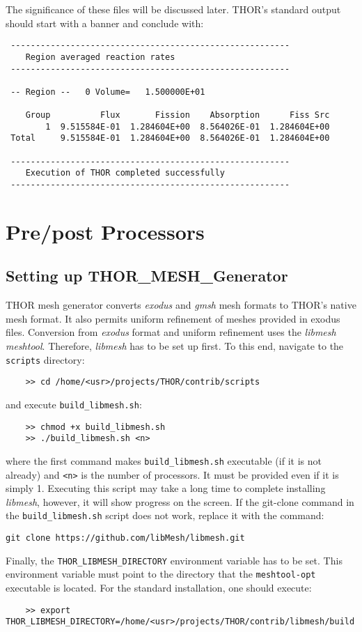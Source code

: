 The significance of these files will be discussed later.
THOR's standard output should start with a banner and conclude with:
\begin{verbatim}
 --------------------------------------------------------
    Region averaged reaction rates
 --------------------------------------------------------

 -- Region --   0 Volume=   1.500000E+01

    Group          Flux       Fission    Absorption      Fiss Src
        1  9.515584E-01  1.284604E+00  8.564026E-01  1.284604E+00
 Total     9.515584E-01  1.284604E+00  8.564026E-01  1.284604E+00

 --------------------------------------------------------
    Execution of THOR completed successfully
 --------------------------------------------------------
\end{verbatim}

\section{Pre/post Processors}

\subsection{Setting up THOR\_MESH\_Generator}
THOR mesh generator converts \textit{exodus} and \textit{gmsh}
mesh formats to THOR's native mesh format. It also permits
uniform refinement of meshes provided in exodus files. Conversion from \textit{exodus} format and uniform refinement uses the
\textit{libmesh}~\cite{libMeshPaper} \textit{meshtool}. Therefore,
\textit{libmesh} has to be set up first. To this end, navigate to the \verb"scripts" directory:
\begin{verbatim}
    >> cd /home/<usr>/projects/THOR/contrib/scripts
\end{verbatim}
and execute \verb"build_libmesh.sh":
\begin{verbatim}
    >> chmod +x build_libmesh.sh
    >> ./build_libmesh.sh <n>
\end{verbatim}
where the first command makes \verb"build_libmesh.sh" executable (if it is not already) and \verb"<n>" is the number of processors. It must be provided even if it is simply 1. Executing this script may take a long time to complete installing \textit{libmesh}, however, it will show progress on the screen. If the git-clone command in the \verb"build_libmesh.sh" script does not work, replace it with the command:
\begin{verbatim}
git clone https://github.com/libMesh/libmesh.git
\end{verbatim}
Finally, the \verb"THOR_LIBMESH_DIRECTORY" environment variable has to be set. This environment variable must point to the directory that the \verb"meshtool-opt" executable is located. For the standard installation, one should execute:
\begin{verbatim}
    >> export THOR_LIBMESH_DIRECTORY=/home/<usr>/projects/THOR/contrib/libmesh/build
\end{verbatim}

